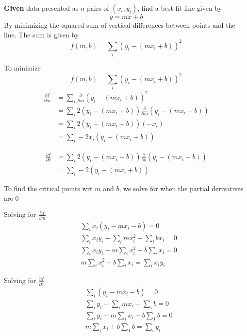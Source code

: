 \begin{framed}
   \textbf{Given} data presented as $n$ pairs of $( x_i, y_i)$, find a best fit line given by 
    \[
     y = mx + b
   \] 
   By minimizing the squared sum of vertical differences between points and the line. The sum is given by
   \[
      f(m, b) = \sum \limits_{i}^{} \left( y_i - \left( m x_i + b \right)  \right)^2 
   \] 
\end{framed}

To minimize \[
   f(m, b) = \sum \limits_{i}^{} \left( y_i - \left( mx_i + b \right)  \right)^2
\]
\begin{align*}
   \frac{\partial f}{\partial m} &= \sum \limits_{i}^{} \frac{\partial }{\partial m} \left( y_i - \left( mx_i + b \right)  \right)^2 \\
                                 &= \sum \limits_{i}^{}2 \left( y_i - \left( mx_i + b \right)  \right) \frac{\partial }{\partial m} \left( y_i - \left( mx_i  + b\right)  \right)  \\
                                 &= \sum \limits_{i}^{} 2 \left( y_i - \left( mx_i + b \right)  \right) \left( -x_i \right) \\
                                 &= \sum \limits_{i}^{} -2x_i \left( y_i - \left( mx_i + b \right)  \right) 
\end{align*}

\begin{align*}
   \frac{\partial f}{\partial b} &= \sum \limits_{i}^{} 2 \left( y_i - \left( mx_i + b \right)  \right)  \frac{\partial }{\partial b} \left( y_i - \left( mx_i + b \right)  \right)  \\ 
                                 &= \sum \limits_{i}^{} -2 \left( y_i - \left( mx_i + b \right)  \right) 
\end{align*}

To find the critical points wrt $m$ and $b$, we solve for when the partial derivatives are $0$

Solving for $ \frac{\partial f}{\partial m}$
\begin{align*}
      & \sum_i x_i \left( y_i - mx_i - b \right)  = 0 \\
      & \sum_i x_i y_i - \sum_i mx_i^2 - \sum_i bx_i = 0 \\
      & \sum_i x_i y_i - m\sum_i x_i^2 - b\sum_i x_i = 0\\
      &m\sum_i x_i^2 + b\sum_i x_i = \sum_i x_i y_i
\end{align*}

Solving for $ \frac{\partial f}{\partial b}$
\begin{align*}
      &\sum_i \left( y_i - mx_i - b \right)  = 0 \\
      &\sum_i y_i - \sum_i mx_i - \sum_i b  = 0 \\
      &\sum_i y_i - m\sum_i x_i - b\sum_1 b = 0 \\
      & m\sum_i x_i + b\sum_1 b = \sum_i y_i 
\end{align*}

